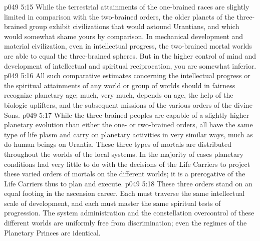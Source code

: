 \vs p049 5:15 While the terrestrial attainments of the one\hyp{}brained races are slightly limited in comparison with the two\hyp{}brained orders, the older planets of the three\hyp{}brained group exhibit civilizations that would astound Urantians, and which would somewhat shame yours by comparison. In mechanical development and material civilization, even in intellectual progress, the two\hyp{}brained mortal worlds are able to equal the three\hyp{}brained spheres. But in the higher control of mind and development of intellectual and spiritual reciprocation, you are somewhat inferior.
\vs p049 5:16 All such comparative estimates concerning the intellectual progress or the spiritual attainments of any world or group of worlds should in fairness recognize planetary age; much, very much, depends on age, the help of the biologic uplifters, and the subsequent missions of the various orders of the divine Sons.
\vs p049 5:17 While the three\hyp{}brained peoples are capable of a slightly higher planetary evolution than either the one\hyp{} or two\hyp{}brained orders, all have the same type of life plasm and carry on planetary activities in very similar ways, much as do human beings on Urantia. These three types of mortals are distributed throughout the worlds of the local systems. In the majority of cases planetary conditions had very little to do with the decisions of the Life Carriers to project these varied orders of mortals on the different worlds; it is a prerogative of the Life Carriers thus to plan and execute.
\vs p049 5:18 These three orders stand on an equal footing in the ascension career. Each must traverse the same intellectual scale of development, and each must master the same spiritual tests of progression. The system administration and the constellation overcontrol of these different worlds are uniformly free from discrimination; even the regimes of the Planetary Princes are identical.
